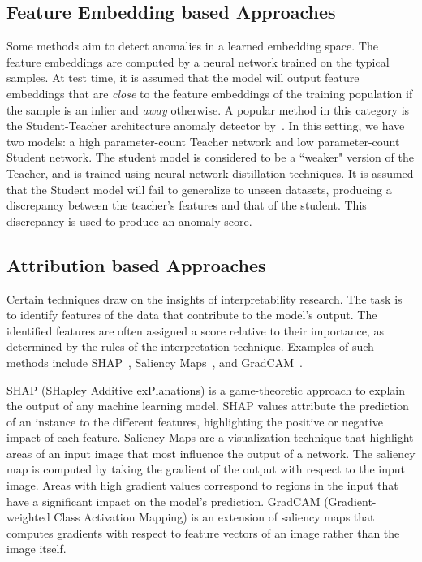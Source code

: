 \subsection*{Feature Embedding based Approaches}
Some methods aim to detect anomalies in a learned embedding space. The feature embeddings are computed by a neural network trained on the typical samples. At test time, it is assumed that the model will output feature embeddings that are \textit{close} to the feature embeddings of the training population if the sample is an inlier and \textit{away} otherwise. A popular method in this category is the Student-Teacher architecture anomaly detector by~\cite{bergmann2020uninformed}. In this setting, we have two models: a high parameter-count Teacher network and low parameter-count Student network. The student model is considered to be a ``weaker" version of the Teacher, and is trained using neural network distillation techniques. It is assumed that the Student model will fail to generalize to unseen datasets, producing a discrepancy between the teacher's features and that of the student. This discrepancy is used to produce an anomaly score.

\subsection*{Attribution based Approaches}
Certain techniques draw on the insights of interpretability research. The task is to identify features of the data that contribute to the model's output. The identified features are often assigned a score relative to their importance, as determined by the rules of the interpretation technique. Examples of such methods include SHAP~\cite{NIPS2017_7062}, Saliency Maps~\cite{Simonyan2013DeepIC}, and GradCAM~\cite{gradcam}.

SHAP (SHapley Additive exPlanations) is a game-theoretic approach to explain the output of any machine learning model. SHAP values attribute the prediction of an instance to the different features, highlighting the positive or negative impact of each feature. Saliency Maps are a visualization technique that highlight areas of an input image that most influence the output of a network. The saliency map is computed by taking the gradient of the output with respect to the input image. Areas with high gradient values correspond to regions in the input that have a significant impact on the model's prediction. GradCAM (Gradient-weighted Class Activation Mapping) is an extension of saliency maps that computes gradients with respect to feature vectors of an image rather than the image itself.


